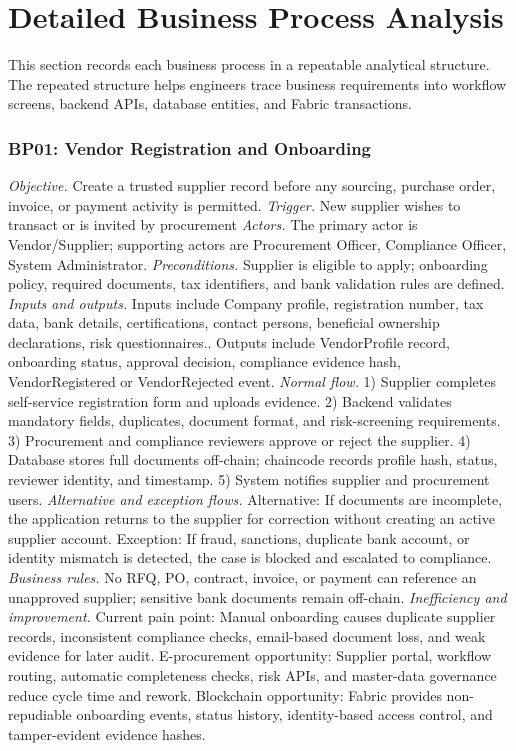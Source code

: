 \documentclass[conference]{IEEEtran}
\begin{document}
\section{Detailed Business Process Analysis}
This section records each business process in a repeatable analytical structure. The repeated structure helps engineers trace business requirements into workflow screens, backend APIs, database entities, and Fabric transactions.


\subsubsection{BP01: Vendor Registration and Onboarding}
\textit{Objective.} Create a trusted supplier record before any sourcing, purchase order, invoice, or payment activity is permitted.
\textit{Trigger.} New supplier wishes to transact or is invited by procurement
\textit{Actors.} The primary actor is Vendor/Supplier; supporting actors are Procurement Officer, Compliance Officer, System Administrator.
\textit{Preconditions.} Supplier is eligible to apply; onboarding policy, required documents, tax identifiers, and bank validation rules are defined.
\textit{Inputs and outputs.} Inputs include Company profile, registration number, tax data, bank details, certifications, contact persons, beneficial ownership declarations, risk questionnaires.. Outputs include VendorProfile record, onboarding status, approval decision, compliance evidence hash, VendorRegistered or VendorRejected event.
\textit{Normal flow.} 1) Supplier completes self-service registration form and uploads evidence. 2) Backend validates mandatory fields, duplicates, document format, and risk-screening requirements. 3) Procurement and compliance reviewers approve or reject the supplier. 4) Database stores full documents off-chain; chaincode records profile hash, status, reviewer identity, and timestamp. 5) System notifies supplier and procurement users.
\textit{Alternative and exception flows.} Alternative: If documents are incomplete, the application returns to the supplier for correction without creating an active supplier account. Exception: If fraud, sanctions, duplicate bank account, or identity mismatch is detected, the case is blocked and escalated to compliance.
\textit{Business rules.} No RFQ, PO, contract, invoice, or payment can reference an unapproved supplier; sensitive bank documents remain off-chain.
\textit{Inefficiency and improvement.} Current pain point: Manual onboarding causes duplicate supplier records, inconsistent compliance checks, email-based document loss, and weak evidence for later audit. E-procurement opportunity: Supplier portal, workflow routing, automatic completeness checks, risk APIs, and master-data governance reduce cycle time and rework. Blockchain opportunity: Fabric provides non-repudiable onboarding events, status history, identity-based access control, and tamper-evident evidence hashes.
\end{document}
